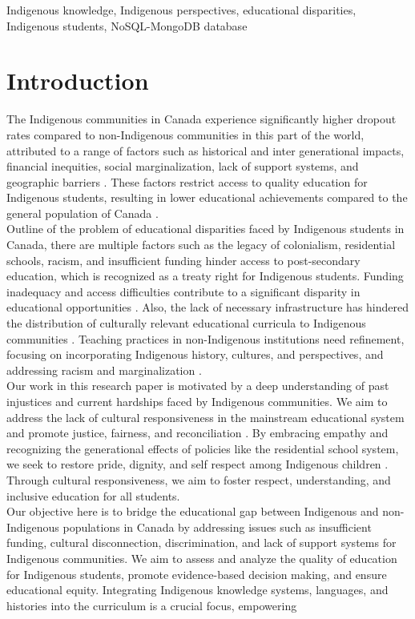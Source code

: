 \documentclass[conference]{IEEEtran}
\begin{document}
\begin{IEEEkeywords}
Indigenous knowledge, Indigenous perspectives, educational disparities, Indigenous students, NoSQL-MongoDB database
\end{IEEEkeywords}


\section{\textbf{Introduction}}
The Indigenous communities in Canada experience significantly higher dropout rates compared to non-Indigenous communities in this part of the world, attributed to a range of factors such as historical and inter generational impacts, financial inequities, social marginalization, lack of support systems, and geographic barriers \cite{r3}. These factors restrict access to quality education for Indigenous students, resulting in lower educational achievements compared to the general population of Canada \cite{r4}.\\Outline of the problem of educational disparities faced by Indigenous students in Canada, there are multiple factors such as the legacy of colonialism, residential schools, racism, and insufficient funding hinder access to post-secondary education, which is recognized as a treaty right for Indigenous students. Funding inadequacy and access difficulties contribute to a significant disparity in educational opportunities \cite{r5}. Also, the lack of necessary infrastructure has hindered the distribution of culturally relevant educational curricula to Indigenous communities \cite{r6}. Teaching practices in non-Indigenous institutions need refinement, focusing on incorporating Indigenous history, cultures, and perspectives, and addressing racism and
marginalization \cite{r7}.\\Our work in this research paper is motivated by a deep understanding of past injustices and current hardships faced by Indigenous communities. We aim to address the lack of cultural responsiveness in the mainstream educational system and promote justice, fairness, and reconciliation \cite{r8}. By embracing empathy and recognizing the generational effects of policies like the residential school system, we seek to restore pride, dignity, and self respect among Indigenous children \cite{r9}. Through cultural responsiveness, we aim to foster respect, understanding, and inclusive education for all students.\\Our objective here is to bridge the educational gap between Indigenous and non-Indigenous populations in Canada by addressing issues such as insufficient funding, cultural disconnection, discrimination, and lack of support systems for Indigenous communities. We aim to assess and analyze the quality of education for Indigenous students, promote evidence-based decision making, and ensure educational equity. Integrating Indigenous knowledge systems, languages, and histories into the curriculum is a crucial focus, empowering
\end{document}
